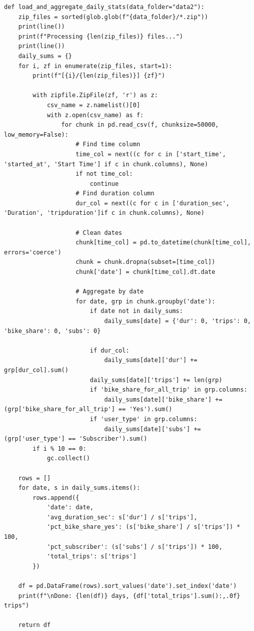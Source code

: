 \documentclass{article}
\begin{document}
\begin{verbatim}
def load_and_aggregate_daily_stats(data_folder="data2"):
    zip_files = sorted(glob.glob(f"{data_folder}/*.zip"))
    print(line())
    print(f"Processing {len(zip_files)} files...")
    print(line())
    daily_sums = {}
    for i, zf in enumerate(zip_files, start=1):
        print(f"[{i}/{len(zip_files)}] {zf}")
        
        with zipfile.ZipFile(zf, 'r') as z:
            csv_name = z.namelist()[0]
            with z.open(csv_name) as f:
                for chunk in pd.read_csv(f, chunksize=50000, low_memory=False):
                    # Find time column
                    time_col = next((c for c in ['start_time', 'started_at', 'Start Time'] if c in chunk.columns), None)
                    if not time_col:
                        continue
                    # Find duration column
                    dur_col = next((c for c in ['duration_sec', 'Duration', 'tripduration']if c in chunk.columns), None)
                    
                    # Clean dates
                    chunk[time_col] = pd.to_datetime(chunk[time_col], errors='coerce')
                    chunk = chunk.dropna(subset=[time_col])
                    chunk['date'] = chunk[time_col].dt.date
            
                    # Aggregate by date
                    for date, grp in chunk.groupby('date'):
                        if date not in daily_sums:
                            daily_sums[date] = {'dur': 0, 'trips': 0, 'bike_share': 0, 'subs': 0}
                        
                        if dur_col:
                            daily_sums[date]['dur'] += grp[dur_col].sum()
                        daily_sums[date]['trips'] += len(grp)
                        if 'bike_share_for_all_trip' in grp.columns:
                            daily_sums[date]['bike_share'] += (grp['bike_share_for_all_trip'] == 'Yes').sum()
                        if 'user_type' in grp.columns:
                            daily_sums[date]['subs'] += (grp['user_type'] == 'Subscriber').sum()
        if i % 10 == 0:
            gc.collect()
    
    rows = []
    for date, s in daily_sums.items():
        rows.append({
            'date': date,
            'avg_duration_sec': s['dur'] / s['trips'],
            'pct_bike_share_yes': (s['bike_share'] / s['trips']) * 100,
            'pct_subscriber': (s['subs'] / s['trips']) * 100,
            'total_trips': s['trips']
        })
    
    df = pd.DataFrame(rows).sort_values('date').set_index('date')
    print(f"\nDone: {len(df)} days, {df['total_trips'].sum():,.0f} trips")
    
    return df
\end{verbatim}
\end{document}
